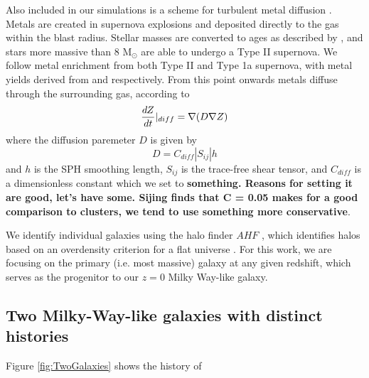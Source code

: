 \documentclass[nofootinbib,twocolumn,prd]{emulateapj}
\begin{document}
Also included in our simulations is a scheme for turbulent metal
diffusion \citep{Shen10}.  Metals are created in supernova explosions
and deposited directly to the gas within the blast radius.  Stellar
masses are converted to ages as described by \citet{Raiteri96}, and
stars more massive than 8 M$_\odot$ are able to undergo a Type II
supernova.  We follow metal enrichment from both Type II and Type 1a
supernova, with metal yields derived from \citet{Weaver93} and
\citet{Thielemann86} respectively.  From this point onwards metals
diffuse through the surrounding gas, according to 
\begin{equation}
\frac{dZ}{dt}|_{diff} = \nabla (D \nabla {Z}) \\
\end{equation}
%
where the diffusion paremeter $D$ is given by
%
\begin{equation}
D = C_{diff} |S_{ij}| h
\end{equation}
%
and $h$ is the SPH smoothing length, $S_{ij}$ is the trace-free shear
tensor, and $C_{diff}$ is a dimensionless constant which we set to
{\bf something.  Reasons for setting it are good, let's have some.
Sijing finds that C = 0.05 makes for a good comparison to clusters, we
tend to use something more conservative}.

We identify individual galaxies using the halo finder $AHF$
\citep{Gill04,Knollmann09}, which identifies halos based on an
overdensity criterion for a flat universe \citep{Gross97}.  For this
work, we are focusing on the primary (i.e. most massive) galaxy at any
given redshift, which serves as the progenitor to our $z = 0$ Milky
Way-like galaxy.



\subsection{Two Milky-Way-like galaxies with distinct histories }

Figure \ref{fig:TwoGalaxies} shows the history of 
\end{document}
